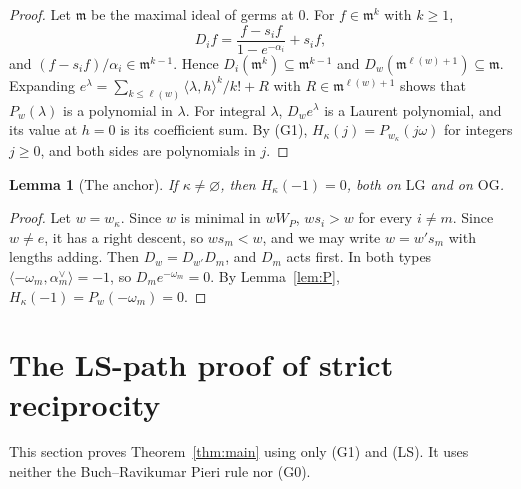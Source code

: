 \documentclass[11pt]{amsart}
\newtheorem{lemma}[theorem]{Lemma}
\theoremstyle{definition}
\theoremstyle{remark}
\newcommand{\LG}{\mathrm{LG}}
\newcommand{\OG}{\mathrm{OG}}
\begin{document}
\begin{proof}
Let $\mathfrak m$ be the maximal ideal of germs at $0$. For $f\in\mathfrak m^k$ with $k\ge1$,
\[ D_if=\frac{f-s_if}{1-e^{-\alpha_i}}+s_if, \]
and $(f-s_if)/\alpha_i\in\mathfrak m^{k-1}$. Hence $D_i(\mathfrak m^k)\subseteq\mathfrak m^{k-1}$
and $D_w(\mathfrak m^{\ell(w)+1})\subseteq\mathfrak m$. Expanding
$e^\lambda=\sum_{k\le\ell(w)}\langle\lambda,h\rangle^k/k!+R$ with $R\in\mathfrak m^{\ell(w)+1}$
shows that $P_w(\lambda)$ is a polynomial in $\lambda$. For integral $\lambda$, $D_we^\lambda$
is a Laurent polynomial, and its value at $h=0$ is its coefficient sum. By (G1),
$H_\kappa(j)=P_{w_\kappa}(j\omega)$ for integers $j\ge0$, and both sides are polynomials in
$j$.
\end{proof}

\begin{lemma}[The anchor]\label{lem:anchor}
If $\kappa\ne\varnothing$, then $H_\kappa(-1)=0$, both on $\LG$ and on $\OG$.
\end{lemma}

\begin{proof}
Let $w=w_\kappa$. Since $w$ is minimal in $wW_P$, $ws_i>w$ for every $i\ne m$. Since $w\ne e$,
it has a right descent, so $ws_m<w$, and we may write $w=w's_m$ with lengths adding. Then
$D_w=D_{w'}D_m$, and $D_m$ acts first. In both types
$\langle-\omega_m,\alpha_m^\vee\rangle=-1$, so $D_me^{-\omega_m}=0$. By
Lemma~\ref{lem:P}, $H_\kappa(-1)=P_w(-\omega_m)=0$.
\end{proof}

\section{The LS-path proof of strict reciprocity}\label{sec:ls}

This section proves Theorem~\ref{thm:main} using only (G1) and (LS). It uses neither
the Buch--Ravikumar Pieri rule nor (G0).
\end{document}
